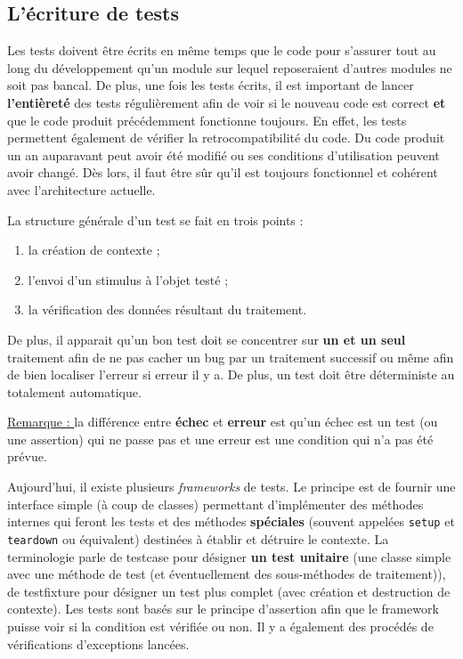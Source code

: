 \documentclass{article}
\begin{document}
	\subsection{L'écriture de tests}
		Les tests doivent être écrits en même temps que le code pour s'assurer tout au long du développement qu'un module sur lequel reposeraient d'autres modules ne soit pas bancal. De plus, une
		fois les tests écrits, il est important de lancer \textbf{l'entièreté} des tests régulièrement afin de voir si le nouveau code est correct \textbf{et} que le code produit précédemment fonctionne
		toujours. En effet, les tests permettent également de vérifier la retrocompatibilité du code. Du code produit un an auparavant peut avoir été modifié ou ses conditions d'utilisation peuvent
		avoir changé. Dès lors, il faut être sûr qu'il est toujours fonctionnel et cohérent avec l'architecture actuelle.

		La structure générale d'un test se fait en trois points :

		\begin{enumerate}
			\item la création de contexte ;
			\item l'envoi d'un stimulus à l'objet testé ;
			\item la vérification des données résultant du traitement.
		\end{enumerate}

		De plus, il apparait qu'un bon test doit se concentrer sur \textbf{un et un seul} traitement afin de ne pas cacher un bug par un traitement successif ou même afin de bien localiser l'erreur
		si erreur il y a. De plus, un test doit être déterministe au totalement automatique.

		\underline{Remarque : } la différence entre \textbf{échec} et \textbf{erreur} est qu'un échec est un test (ou une assertion) qui ne passe pas et une erreur est une condition qui n'a pas été
		prévue.

		Aujourd'hui, il existe plusieurs \textit{frameworks} de tests. Le principe est de fournir une interface simple (à coup de classes) permettant d'implémenter des méthodes internes qui feront les
		tests et des méthodes \textbf{spéciales} (souvent appelées \texttt{setup} et \texttt{teardown} ou équivalent) destinées à établir et détruire le contexte. La terminologie parle de testcase
		pour désigner \textbf{un test unitaire} (une classe simple avec une méthode de test (et éventuellement des sous-méthodes de traitement)), de testfixture pour désigner un test plus
		complet (avec création et destruction de contexte). Les tests sont basés sur le principe d'assertion afin que le framework puisse voir si la condition est vérifiée ou non. Il y a également
		des procédés de vérifications d'exceptions lancées.
\end{document}
